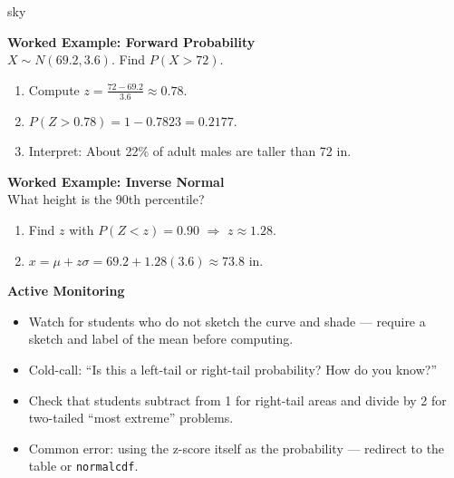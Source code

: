 \documentclass[10pt]{article}
\begin{document}
\begin{skillbox}{sky}
\begin{minipage}[t]{0.48\linewidth}
    \textbf{Worked Example: Forward Probability}\\
    $X \sim N(69.2, 3.6)$. Find $P(X > 72)$.
    \begin{enumerate}
        \item Compute $z = \frac{72 - 69.2}{3.6} \approx 0.78$.
        \item $P(Z > 0.78) = 1 - 0.7823 = 0.2177$.
        \item Interpret: About 22\% of adult males are taller than 72 in.
    \end{enumerate}
    \textbf{Worked Example: Inverse Normal}\\
    What height is the 90th percentile?
    \begin{enumerate}
        \item Find $z$ with $P(Z < z) = 0.90$ $\Rightarrow$ $z \approx 1.28$.
        \item $x = \mu + z\sigma = 69.2 + 1.28(3.6) \approx 73.8$ in.
    \end{enumerate}
\end{minipage}
\hfill
\begin{minipage}[t]{0.48\linewidth}
    \textbf{Active Monitoring}
    \begin{itemize}
        \item Watch for students who do not sketch the curve and shade --- require a
              sketch and label of the mean before computing.
        \item Cold-call: ``Is this a left-tail or right-tail probability? How do you
              know?''
        \item Check that students subtract from 1 for right-tail areas and divide by 2
              for two-tailed ``most extreme'' problems.
        \item Common error: using the z-score itself as the probability --- redirect to
              the table or \texttt{normalcdf}.
    \end{itemize}
\end{minipage}
\end{skillbox}
\end{document}
